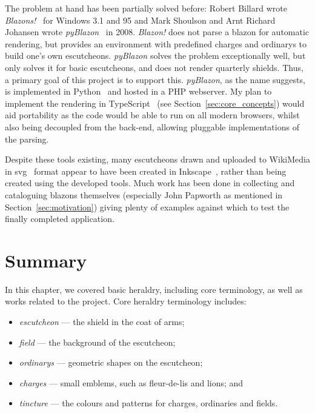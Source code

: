 \documentclass[nobib, a4paper, twoside, justified]{tufte-book}
\makeatletter
\newcommand{\svg}{\gls{svg}\@\xspace}
\newcommand{\charges}{\glspl{charge}\@\xspace}
\newcommand{\blazons}{\glspl{blazon}\@\xspace}
\makeatother
\begin{document}
The problem at hand has been partially solved before: Robert Billard wrote
\textit{Blazons!}~\autocite{dos_blazon} for Windows 3.1 and 95 and Mark Shoulson and Arnt Richard
Johansen wrote \textit{pyBlazon}~\autocite{pyblazon} in 2008. \textit{Blazon!} does not parse a
blazon for automatic rendering, but provides an environment with predefined \charges and
\glspl{ordinary} to build one's own \glspl{escutcheon}. \textit{pyBlazon} solves the problem
exceptionally well, but only solves it for basic escutcheons, and does not render quarterly
shields. Thus, a primary goal of this project is to support this. \textit{pyBlazon}, as the name
suggests, is implemented in Python~\autocite{python} and hosted in a PHP webserver. My plan to implement the
rendering in TypeScript~\autocite{typescript} (see Section~\ref{sec:core_concepts}) would aid portability as the code
would be able to run on all modern browsers, whilst also being decoupled from the back-end,
allowing pluggable implementations of the parsing.

Despite these tools existing, many escutcheons drawn and uploaded to WikiMedia in
\svg~\autocite{ferraiolo2000scalable} format appear to have been created in
Inkscape~\autocite{inkscape}, rather than being created using the developed tools. Much work has
been done in collecting and cataloguing \blazons themselves (especially John Papworth as
mentioned in Section~\ref{sec:motivation}) giving plenty of examples against which to test the
finally completed application.

\section{Summary}%
\label{sec:background_summary}

In this chapter, we covered basic heraldry, including core terminology, as well as works related to
the project. Core heraldry terminology includes:

\pagebreak%

\begin{itemize}
  \item \textit{\Gls{escutcheon}} --- the shield in the coat of arms;
  \item \textit{\Gls{field}} --- the background of the escutcheon;
  \item \textit{\Glspl{ordinary}} --- geometric shapes on the escutcheon;
  \item \textit{\Glspl{charge}} --- small emblems, such as fleur-de-lis and lions; and
  \item \textit{\Gls{tincture}} --- the colours and patterns for \charges, ordinaries and fields.
\end{itemize}
\end{document}
